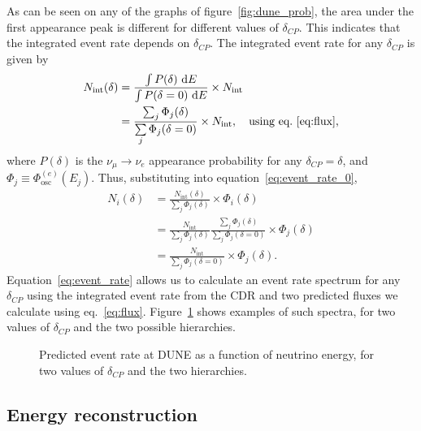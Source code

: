 As can be seen on any of the graphs of figure~\ref{fig:dune_prob}, the area under the first
appearance peak is different for different values of $\delta_{CP}$. This
indicates that the integrated event rate depends on $\delta_{CP}$.
The integrated event rate for any $\delta_{CP}$ is given by
\begin{align}
	N_\text{int} (\delta) &= \frac{\int P (
	\delta)~\mathrm{d} E}{\int P (
	\delta=0)~\mathrm{d} E} \times N_\text{int}\nonumber\\
		&= \frac{\sum_j \Phi_j (\delta) }{\sum\limits_j \Phi_j (\delta=0)} \times
	N_\text{int},\quad\text{using eq.~\ref{eq:flux},}\nonumber
\end{align}
where $P(\delta)$ is the $\nu_\mu\rightarrow\nu_e$ appearance probability
for any $\delta_{CP}=\delta$, and $\Phi_j \equiv \Phi^{(e)}_\text{osc}(E_j)$.
Thus, substituting into equation~\ref{eq:event_rate_0},
\begin{align}
	N_i (\delta) &= \frac{N_\text{int}(\delta)}{\sum\limits_j \Phi_j (\delta)}
	\times \Phi_i (\delta)\nonumber\\
	&= \frac{N_\text{int}}{\sum\limits_j \Phi_j (\delta)} \frac{\sum_j \Phi_j
	(\delta)}{\sum\limits_j \Phi_j (\delta=0)} \times \Phi_j(\delta)\nonumber\\
	&= \frac{N_\text{int}}{\sum\limits_j \Phi_j (\delta=0)} \times
	\Phi_j(\delta).\label{eq:event_rate}
\end{align}
Equation~\ref{eq:event_rate} allows us to calculate an event rate spectrum
for any $\delta_{CP}$ using the integrated event rate from the CDR and two
predicted fluxes we calculate using eq.~\ref{eq:flux}.
Figure~\ref{fig:event_rate} shows examples of such spectra, for two values of
$\delta_{CP}$ and the two possible hierarchies.



\begin{figure}
	\centering
	\caption{Predicted event rate at DUNE as a function of neutrino energy, for
	two values of $\delta_{CP}$ and the two hierarchies.}
\label{fig:event_rate}
\end{figure}

\subsection{Energy reconstruction}





